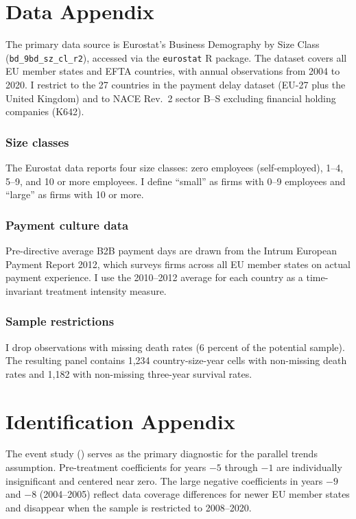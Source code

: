 \documentclass[12pt]{article}
\begin{document}
\section{Data Appendix}
\label{app:data}

The primary data source is Eurostat's Business Demography by Size Class (\texttt{bd\_9bd\_sz\_cl\_r2}), accessed via the \texttt{eurostat} R package. The dataset covers all EU member states and EFTA countries, with annual observations from 2004 to 2020. I restrict to the 27 countries in the payment delay dataset (EU-27 plus the United Kingdom) and to NACE Rev.~2 sector B--S excluding financial holding companies (K642).

\subsubsection*{Size classes} The Eurostat data reports four size classes: zero employees (self-employed), 1--4, 5--9, and 10 or more employees. I define ``small'' as firms with 0--9 employees and ``large'' as firms with 10 or more.

\subsubsection*{Payment culture data} Pre-directive average B2B payment days are drawn from the Intrum European Payment Report 2012, which surveys firms across all EU member states on actual payment experience. I use the 2010--2012 average for each country as a time-invariant treatment intensity measure.

\subsubsection*{Sample restrictions} I drop observations with missing death rates (6 percent of the potential sample). The resulting panel contains 1,234 country-size-year cells with non-missing death rates and 1,182 with non-missing three-year survival rates.

\section{Identification Appendix}
\label{app:identification}

The event study () serves as the primary diagnostic for the parallel trends assumption. Pre-treatment coefficients for years $-5$ through $-1$ are individually insignificant and centered near zero. The large negative coefficients in years $-9$ and $-8$ (2004--2005) reflect data coverage differences for newer EU member states and disappear when the sample is restricted to 2008--2020.
\end{document}
